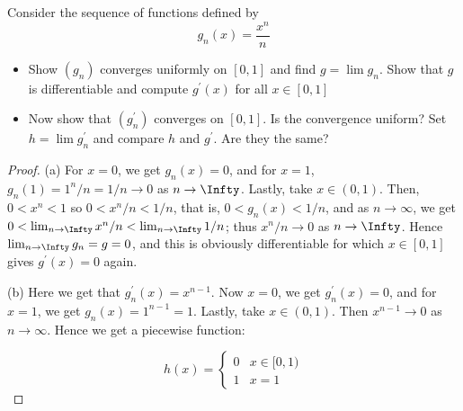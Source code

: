 \documentclass[oneside]{amsart}
\theoremstyle{definition}
\newcommand{\pp}{\prime}
\begin{document}
\begin{tcolorbox}[colback=black!5!white,colframe=black!75!black,title= Exercise $5.4.$] Consider the sequence of functions defined by $$g_n(x) = \frac{x^n}{n}$$ 
\begin{itemize}
	\item [(a)] Show $(g_n)$ converges uniformly on $[0,1]$ and find $g =\lim g_n$. Show that $g$ is differentiable and compute $g^\pp (x) $ for all $x \in [0,1]$
	\item [(b)] Now show that $(g_n^\pp)$ converges on $[0,1]$. Is the convergence uniform? Set $h = \lim g_n^\pp$ and compare $h$ and $g^\pp$. Are they the same?
\end{itemize}
\tcblower 
\begin{proof}  (a) For $x = 0$, we get $g_n(x) = 0$, and for $x = 1$, $g_n(1) = 1^n/n = 1/n \to 0$ as $n \to \Infty$. Lastly, take $x \in (0,1)$. Then, $0<x^n < 1$ so $0<x^n/n< 1/n$, that is, $0<g_n(x) < 1/n$, and as $n \to \infty$, we get $0<\lim_{n\to \Infty} x^n/n< \lim_{n \to \Infty} 1/n$; thus $x^n/n \to 0$ as $n \to \Infty$. Hence $\lim_{n \to \Infty} g_n = g =0$, and this is obviously differentiable for which $x \in [0,1]$ gives $g^\pp (x)= 0$ again. 

(b) Here we get that $g_n^\pp (x) = x^{n-1}$. Now $x = 0$, we get $g_n^\pp (x) = 0$, and for $x = 1$, we get $g_n(x)=1^{n-1} =1$. Lastly, take $x \in (0,1)$. Then $x^{n-1} \to 0$ as $n \to \infty$. Hence we get a piecewise function:

\[
h (x) = \begin{cases}
	0  &x \in [0,1) \\
	1 & x =1
	\end{cases}
\]
\end{proof} 
\end{tcolorbox}
\end{document}
